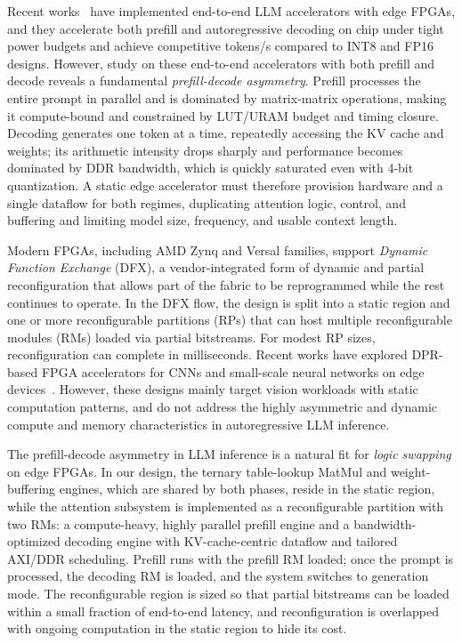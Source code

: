 \documentclass[9pt,sigconf]{acmart}
\begin{document}

Recent works~\cite{moitra2025meadow,qiao2025tellme} have implemented end-to-end LLM accelerators with edge FPGAs, and they accelerate both prefill and autoregressive decoding on chip under tight power budgets and achieve competitive tokens/s compared to INT8 and FP16 designs. However, study on these end-to-end accelerators with both prefill and decode reveals a fundamental \emph{prefill-decode asymmetry}. Prefill processes the entire prompt in parallel and is dominated by matrix-matrix operations, making it compute-bound and constrained by LUT/URAM budget and timing closure. Decoding generates one token at a time, repeatedly accessing the KV cache and weights; its arithmetic intensity drops sharply and performance becomes dominated by DDR bandwidth, which is quickly saturated even with 4-bit quantization. A static edge accelerator must therefore provision hardware and a single dataflow for both regimes, duplicating attention logic, control, and buffering and limiting model size, frequency, and usable context length.

Modern FPGAs, including AMD Zynq and Versal families, support \emph{Dynamic Function Exchange} (DFX), a vendor-integrated form of dynamic and partial reconfiguration that allows part of the fabric to be reprogrammed while the rest continues to operate. In the DFX flow, the design is split into a static region and one or more reconfigurable partitions (RPs) that can host multiple reconfigurable modules (RMs) loaded via partial bitstreams. For modest RP sizes, reconfiguration can complete in milliseconds. 
Recent works have explored DPR-based FPGA accelerators for CNNs and small-scale neural networks on edge devices~\cite{dpr_fpl21,dpr_hpec19,dpr_fpl19}. However, these designs mainly target vision workloads with static computation patterns, and do not address the highly asymmetric and dynamic compute and memory characteristics in autoregressive LLM inference.

The prefill-decode asymmetry in LLM inference is a natural fit for \emph{logic swapping} on edge FPGAs. In our design, the ternary table-lookup MatMul and weight-buffering engines, which are shared by both phases, reside in the static region, while the attention subsystem is implemented as a reconfigurable partition with two RMs: a compute-heavy, highly parallel prefill engine and a bandwidth-optimized decoding engine with KV-cache-centric dataflow and tailored AXI/DDR scheduling. Prefill runs with the prefill RM loaded; once the prompt is processed, the decoding RM is loaded, and the system switches to generation mode. The reconfigurable region is sized so that partial bitstreams can be loaded within a small fraction of end-to-end latency, and reconfiguration is overlapped with ongoing computation in the static region to hide its cost.
\end{document}
